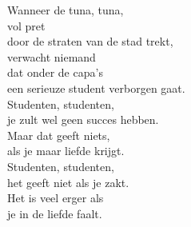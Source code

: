\clearpage
\begin{translation}
Wanneer de tuna, tuna,\\
vol pret\\
door de straten van de stad trekt,\\
verwacht niemand\\
dat onder de capa's\\
een serieuze student verborgen gaat.\\
Studenten, studenten,\\
je zult wel geen succes hebben.\\
Maar dat geeft niets,\\
als je maar liefde krijgt.\\
Studenten, studenten,\\
het geeft niet als je zakt.\\
Het is veel erger als\\
je in de liefde faalt.\\
\end{translation}

